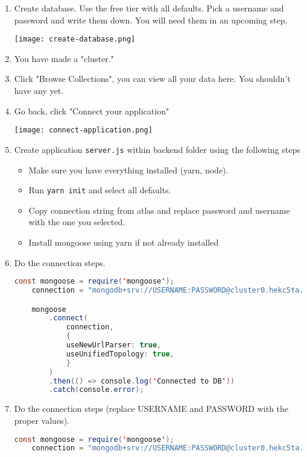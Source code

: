 \begin{enumerate}
    \item Create database. Use the free tier with all defaults. Pick a username and password and write them down. You will need them in an upcoming step.
    \begin{figure*}[h!]
        \texttt{[image: create-database.png]}
    \end{figure*}
    \item You have made a "cluster."
    \item Click "Browse Collections", you can view all your data here. You shouldn't have any yet.
    \item Go back, click "Connect your application"
    \begin{center}
        \texttt{[image: connect-application.png]}
    \end{center}
    \item Create application \texttt{server.js} within backend folder using the following steps
    \begin{itemize}
        \item Make sure you have everything installed (yarn, node).
        \item Run \texttt{yarn init} and select all defaults.
        \item Copy connection string from atlas and replace password and username with the one you selected.
        \item Install mongoose using yarn if not already installed
    \end{itemize}
    \item Do the connection steps.
    \begin{lstlisting}[language=Java]
    const mongoose = require('mongoose');
    connection = "mongodb+srv://USERNAME:PASSWORD@cluster0.hekc5ta.mongodb.net/?retryWrites=true&w=majority"

    mongoose
        .connect(
            connection,
            {
            useNewUrlParser: true,
            useUnifiedTopology: true,
            }
        )
        .then(() => console.log('Connected to DB'))
        .catch(console.error);
    \end{lstlisting}
    \item Do the connection steps (replace USERNAME and PASSWORD with the proper values).
    \begin{lstlisting}[language=Java]
    const mongoose = require('mongoose');
    connection = "mongodb+srv://USERNAME:PASSWORD@cluster0.hekc5ta.mongodb.net/?retryWrites=true&w=majority"


\end{lstlisting}
\end{enumerate}
